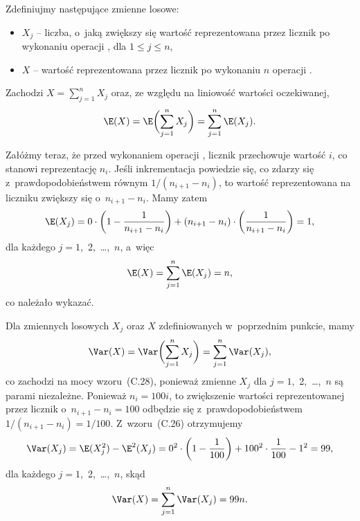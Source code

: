 \problems


\subproblem %
Zdefiniujmy następujące zmienne losowe:
\begin{itemize}
	\item $X_j$ -- liczba, o~jaką zwiększy się wartość reprezentowana przez licznik po  wykonaniu operacji , dla $1\le j\le n$,
	\item $X$ -- wartość reprezentowana przez licznik po wykonaniu $n$ operacji .
\end{itemize}
Zachodzi $X=\sum_{j=1}^nX_j$ oraz, ze względu na liniowość wartości oczekiwanej,
\[
	\E(X) = \E\biggl(\sum_{j=1}^nX_j\biggr) = \sum_{j=1}^n\E(X_j).
\]

Załóżmy teraz, że przed wykonaniem  operacji , licznik przechowuje wartość $i$, co stanowi reprezentację $n_i$. Jeśli inkrementacja powiedzie się, co zdarzy się z~prawdopodobieństwem równym $1/(n_{i+1}-n_i)$, to wartość reprezentowana na liczniku zwiększy się o~$n_{i+1}-n_i$. Mamy zatem
\[
	\E(X_j) = 0\cdot\left(1-\frac{1}{n_{i+1}-n_i}\right)+(n_{i+1}-n_i)\cdot\left(\frac{1}{n_{i+1}-n_i}\right) = 1,
\]
dla każdego $j=1$,~2,~\dots,~$n$, a~więc
\[
	\E(X) = \sum_{j=1}^n\E(X_j) = n,
\]
co należało wykazać.

\subproblem %
Dla zmiennych losowych $X_j$ oraz $X$ zdefiniowanych w~poprzednim punkcie, mamy
\[
	\Var(X) = \Var\biggl(\sum_{j=1}^nX_j\biggr) = \sum_{j=1}^n\Var(X_j),
\]
co zachodzi na mocy wzoru~(C.28), ponieważ zmienne $X_j$ dla $j=1$,~2,~\dots,~$n$ są parami niezależne. Ponieważ $n_i=100i$, to zwiększenie wartości reprezentowanej przez licznik o~$n_{i+1}-n_i=100$ odbędzie się z~prawdopodobieństwem $1/(n_{i+1}-n_i)=1/100$. Z~wzoru~(C.26) otrzymujemy
\[
	\Var(X_j) = \E(X_j^2)-\E^2(X_j) = 0^2\cdot\left(1-\frac{1}{100}\right)+100^2\cdot\frac{1}{100}-1^2 = 99,
\]
dla każdego $j=1$,~2,~\dots,~$n$, skąd
\[
	\Var(X) = \sum_{j=1}^n\Var(X_j) = 99n.
\]


